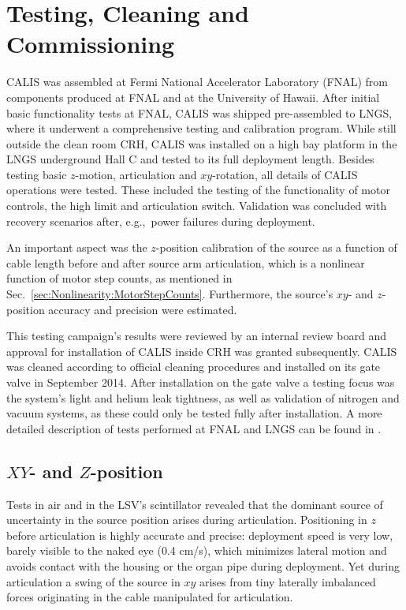 \section{Testing, Cleaning and Commissioning} \label{sec:Testing}\label{sec:Commissioning}
CALIS was assembled at Fermi National Accelerator Laboratory (FNAL) from components produced at FNAL and at the University of Hawaii. After initial basic functionality tests at FNAL, CALIS was shipped pre-assembled to LNGS, where it underwent a comprehensive testing and calibration program. While still outside the clean room CRH, CALIS was installed on a high bay platform in the LNGS underground Hall C and tested to its full deployment length. Besides testing basic $z$-motion, articulation and $xy$-rotation, all details of CALIS operations were tested. These included the testing of the functionality of motor controls, the high limit and articulation switch. Validation was concluded with recovery scenarios after, e.g.,~power failures during deployment.

An important aspect was the $z$-position calibration of the source as a function of cable length before and after source arm articulation, which is a nonlinear function of motor step counts, as mentioned in Sec.~\ref{sec:Nonlinearity:MotorStepCounts}. Furthermore, the source's $xy$- and $z$-position accuracy and precision were estimated.

This testing campaign's results were reviewed by an internal review board and approval for installation of CALIS inside CRH was granted subsequently. CALIS was cleaned according to official cleaning procedures and installed on its gate valve in September 2014.
After installation on the gate valve a testing focus was the system's light and helium leak tightness, as well as validation of nitrogen and vacuum systems, as these could only be tested fully after installation. A more detailed description of tests performed at FNAL and LNGS can be found in \cite{thesis:Hackett, thesis:Edkins}.

\subsection*{$XY$- and $Z$-position}
Tests in air and in the LSV's scintillator revealed that the dominant source of uncertainty in the source position arises during articulation. Positioning in $z$ before articulation is highly accurate and precise: deployment speed is very low, barely visible to the naked eye (0.4 cm/s), which minimizes lateral motion and avoids contact with the housing or the organ pipe during deployment. Yet during articulation a swing of the source in $xy$ arises from tiny laterally imbalanced forces originating in the cable manipulated for articulation. 

